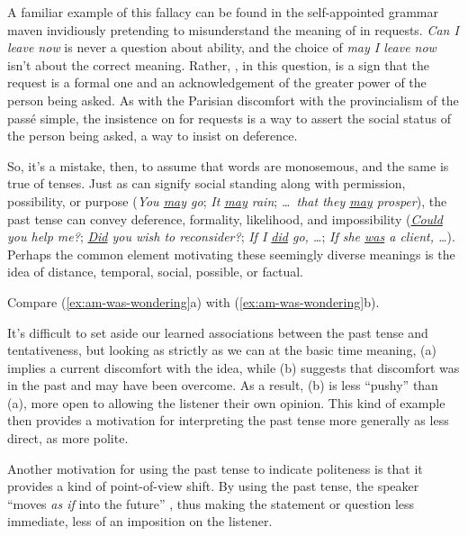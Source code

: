 A familiar example of this fallacy can be found in the self-appointed grammar maven invidiously pretending to misunderstand the meaning of  in requests. \textit{Can I leave now} is never a question about ability, and the choice of \textit{may I leave now} isn't about the correct meaning. Rather, , in this question, is a sign that the request is a formal one and an acknowledgement of the greater power of the person being asked. As with the Parisian discomfort with the provincialism of the passé simple, the insistence on  for requests is a way to assert the social status of the person being asked, a way to insist on deference.

So, it's a mistake, then, to assume that words are monosemous, and the same is true of tenses. Just as  can signify social standing along with permission, possibility, or purpose (\textit{You \uline{may} go}; \textit{It \uline{may} rain}; \textit{\dots~that they \uline{may} prosper}), the past tense can convey deference, formality, likelihood, and impossibility (\textit{\uline{Could} you help me?}; \textit{\uline{Did} you wish to reconsider?}; \textit{If I \uline{did} go, \dots}; \textit{If she \uline{was} a client, \dots}). Perhaps the common element motivating these seemingly diverse meanings is the idea of distance, temporal, social, possible, or factual.

Compare (\ref{ex:am-was-wondering}a) with (\ref{ex:am-was-wondering}b).

\ea \label{ex:am-was-wondering}
    \z
\z

It's difficult to set aside our learned associations between the past tense and tentativeness, but looking as strictly as we can at the basic time meaning, (a) implies a current discomfort with the idea, while (b) suggests that discomfort was in the past and may have been overcome. As a result, (b) is less \enquote{pushy} than (a), more open to allowing the listener their own opinion. This kind of example then provides a motivation for interpreting the past tense more generally as less direct, as more polite.

Another motivation for using the past tense to indicate politeness is that it provides a kind of point-of-view shift. By using the past tense, the speaker \enquote{moves \textit{as if} into the future} \citep[204]{Brown1978}, thus making the statement or question less immediate, less of an imposition on the listener.

